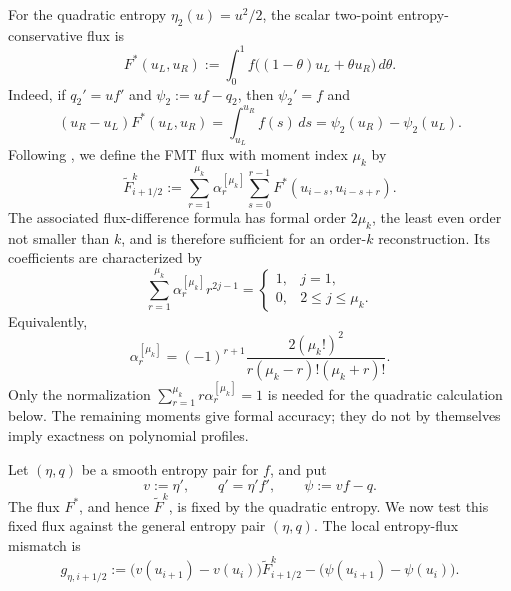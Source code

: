 \documentclass[11pt]{amsart}
\theoremstyle{plain}
\theoremstyle{definition}
\theoremstyle{remark}
\numberwithin{equation}{section}
\theoremstyle{plain}
\begin{document}
For the quadratic entropy $\eta_2(u)=u^2/2$, the scalar two-point
entropy-conservative flux is
\begin{equation}\label{eq:two-point-quadratic-entropy-flux}
	F^*(u_L,u_R)
	:=\int_0^1
	f\bigl((1-\theta)u_L+\theta u_R\bigr)\,d\theta.
\end{equation}
Indeed, if $q_2'=uf'$ and $\psi_2:=uf-q_2$, then $\psi_2'=f$ and
\begin{equation}\label{eq:quadratic-entropy-conservative-identity}
	(u_R-u_L)F^*(u_L,u_R)
	=\int_{u_L}^{u_R}f(s)\,ds
	=\psi_2(u_R)-\psi_2(u_L).
\end{equation}
Following \cite{LMR,FMTtecno}, we define the FMT flux with moment index $\mu_k$ by
\begin{equation}\label{eq:FMT-flux-profile}
	\widetilde F^k_{i+1/2}
	:=
	\sum_{r=1}^{\mu_k}\alpha_r^{[\mu_k]}
	\sum_{s=0}^{r-1}F^*(u_{i-s},u_{i-s+r}).
\end{equation}
The associated flux-difference formula has formal order $2\mu_k$, the
least even order not smaller than $k$, and is therefore sufficient for an
order-$k$ reconstruction.  Its coefficients are
characterized by
\begin{equation}\label{eq:FMT-moment-conditions}
	\sum_{r=1}^{\mu_k}\alpha_r^{[\mu_k]}r^{2j-1}
	=
	\begin{cases}
		1,&j=1,\\
		0,&2\le j\le\mu_k.
	\end{cases}
\end{equation}
Equivalently,
\begin{equation}\label{eq:FMT-coefficient-formula}
	\alpha_r^{[\mu_k]}
	=(-1)^{r+1}
	\frac{2(\mu_k!)^2}
	{r(\mu_k-r)!(\mu_k+r)!}.
\end{equation}
Only the normalization
$\sum_{r=1}^{\mu_k}r\alpha_r^{[\mu_k]}=1$ is needed for the quadratic
calculation below.  The remaining moments give formal accuracy; they do not
by themselves imply exactness on polynomial profiles.

Let $(\eta,q)$ be a smooth entropy pair for $f$, and put
\begin{equation}\label{eq:entropy-pair-notation-section6}
	v:=\eta',
	\qquad
	q'=\eta'f',
	\qquad
	\psi:=vf-q.
\end{equation}
The flux $F^*$, and hence $\widetilde F^k$, is fixed by the quadratic
entropy.  We now test this fixed flux against the general entropy pair
$(\eta,q)$.
The local entropy-flux mismatch is
\begin{equation}\label{eq:mismatch-def-profile}
	g_{\eta,i+1/2}
	:=
	\bigl(v(u_{i+1})-v(u_i)\bigr)\widetilde F^k_{i+1/2}
	-\bigl(\psi(u_{i+1})-\psi(u_i)\bigr).
\end{equation}
\end{document}
